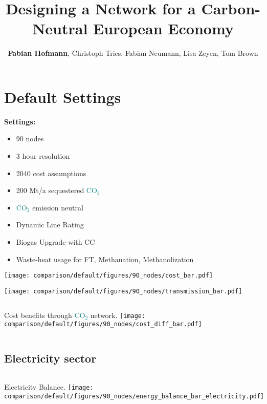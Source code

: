 \documentclass[12pt, aspectratio=169]{beamer}
\title{Designing a \carbon{} Network for a Carbon-Neutral European Economy}
\author{\textbf{Fabian Hofmann}, Christoph Tries, Fabian Neumann, Lisa Zeyen, Tom Brown}
\institute{Technical University Berlin}
\date{}
\newcommand{\carbon}{\textcolor{teal}{CO$_2$}}
\begin{document}
\begin{frame}[plain]
    \titlepage
\end{frame}


\section*{Default Settings}

\begin{frame}
    \textbf{Settings:}
    \begin{itemize}
        \item 90 nodes
        \item 3 hour resolution
        \item 2040 cost assumptions
        \item 200 Mt/a sequestered \carbon{}
        \item \carbon{} emission neutral
        \item Dynamic Line Rating
        \item Biogas Upgrade with CC
        \item Waste-heat usage for FT, Methanation, Methanolization
    \end{itemize}
\end{frame}

\begin{frame}
        \texttt{[image: comparison/default/figures/90\_nodes/cost\_bar.pdf]}
\end{frame}

\begin{frame}
    \texttt{[image: comparison/default/figures/90\_nodes/transmission\_bar.pdf]}
\end{frame}


\begin{frame}
    \begin{columns}
        Cost benefits through \carbon{} network.
        \texttt{[image: comparison/default/figures/90\_nodes/cost\_diff\_bar.pdf]}
    \end{columns}
\end{frame}

\subsection*{Electricity sector}

\begin{frame}
    \begin{columns}
        Electricity Balance.
        \texttt{[image: comparison/default/figures/90\_nodes/energy\_balance\_bar\_electricity.pdf]}
    \end{columns}
\end{frame}
\end{document}
